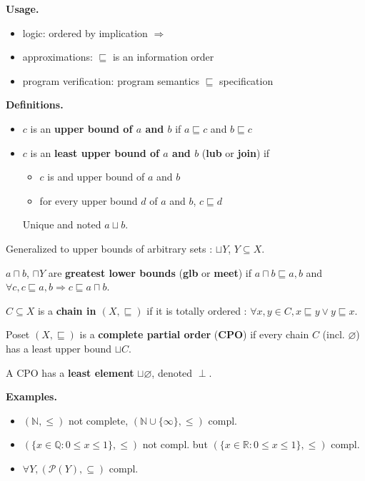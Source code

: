 \documentclass[10pt,landscape]{article}
\begin{document}
\begin{multicols}{3}
\textbf{Usage.}
\begin{itemize}\setlength{\itemsep}{-0.7mm}
\item logic: ordered by implication $\Rightarrow$
\item approximations: $\sqsubseteq$ is an information order
\item program verification: program semantics $\sqsubseteq$ specification
\end{itemize}

\textbf{Definitions.}
\begin{itemize}\setlength{\itemsep}{-0.7mm}
\item $c$ is an \textbf{upper bound of $a$ and $b$} if $a \sqsubseteq c$ and $b \sqsubseteq c$
\item { $c$ is an \textbf{least upper bound of $a$ and $b$} (\textbf{lub} or \textbf{join}) if
  \begin{itemize}\setlength{\itemsep}{-0.7mm}
  \item $c$ is and upper bound of $a$ and $b$
  \item for every upper bound $d$ of $a$ and $b$, $c \sqsubseteq d$
  \end{itemize}
  Unique and noted $a \sqcup b$.
}
\end{itemize}

Generalized to upper bounds of arbitrary sets : $\sqcup Y$, $Y \subseteq X$.

$a \sqcap b$, $\sqcap Y$ are \textbf{greatest lower bounds} (\textbf{glb} or \textbf{meet}) if $a \sqcap b \sqsubseteq a, b$ and $\forall c, c \sqsubseteq a, b \Rightarrow c \sqsubseteq a \sqcap b$.

$C \subseteq X$ is a \textbf{chain in $(X, \sqsubseteq)$} if it is totally ordered : $\forall x, y \in C, x \sqsubseteq y \vee y \sqsubseteq x$.

Poset $(X, \sqsubseteq)$ is a \textbf{complete partial order} (\textbf{CPO}) if every chain $C$ (incl. $\varnothing$) has a least upper bound $\sqcup C$.

A CPO has a \textbf{least element} $\sqcup \varnothing$, denoted $\perp$.

\textbf{Examples.}
\begin{itemize}\setlength{\itemsep}{-0.7mm}
\item $(\mathbb{N}, \leq)$ not complete, $(\mathbb{N} \cup \{ \infty \}, \leq)$ compl.
\item $(\{ x \in \mathbb{Q} : 0 \leq x \leq 1\}, \leq)$ not compl. but $(\{ x \in \mathbb{R} : 0 \leq x \leq 1\}, \leq)$ compl.
\item $\forall Y, (\mathcal{P}(Y), \subseteq)$ compl.
\end{itemize}


\end{multicols}
\end{document}
